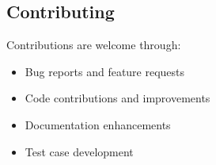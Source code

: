 \documentclass[12pt,a4paper]{article}
\begin{document}
\subsection{Contributing}
Contributions are welcome through:
\begin{itemize}
    \item Bug reports and feature requests
    \item Code contributions and improvements
    \item Documentation enhancements
    \item Test case development
\end{itemize}
\end{document}
